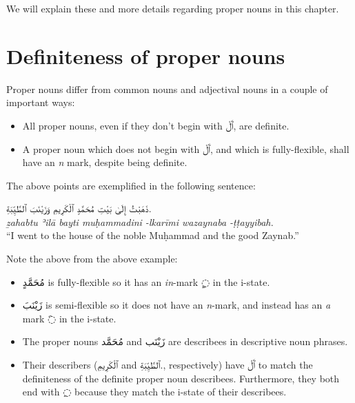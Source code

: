 \documentclass[
  10pt,
]{book}
\providecommand{\tightlist}{%
  \setlength{\itemsep}{0pt}\setlength{\parskip}{0pt}}
\begin{document}
We will explain these and more details regarding proper nouns in this chapter.

\section{Definiteness of proper nouns}\label{definiteness-of-proper-nouns}

Proper nouns differ from common nouns and adjectival nouns in a couple of important ways:

\begin{itemize}
\tightlist
\item
  All proper nouns, even if they don't begin with \foreignlanguage{arabic}{ٱَلْ}, are definite.
\item
  A proper noun which does not begin with \foreignlanguage{arabic}{ٱَلْ}, and which is fully-flexible, shall have an \emph{n} mark, despite being definite.
\end{itemize}

The above points are exemplified in the following sentence:

\foreignlanguage{arabic}{ذَهَبْتُ إِلَىٰ بَيْتِ مُحَمَّدٍ ٱلْکَرِيمِ وَزَيْنَبَ ٱلطَّيِّبَةِ.}\\
\emph{ẕahabtu ʾilā bayti muḥammadini -lkarīmi wazaynaba -ṭṭayyibah.}\\
\enquote{I went to the house of the noble Muḥammad and the good Zaynab.}

Note the above from the above example:

\begin{itemize}
\tightlist
\item
  \foreignlanguage{arabic}{مُحَمَّدٍ} is fully-flexible so it has an \emph{in}-mark \foreignlanguage{arabic}{◌ٍ} in the i-state.
\item
  \foreignlanguage{arabic}{زَيْنَبَ} is semi-flexible so it does not have an \emph{n}-mark, and instead has an \emph{a} mark \foreignlanguage{arabic}{◌َ} in the i-state.
\item
  The proper nouns \foreignlanguage{arabic}{مُحَمَّد} and \foreignlanguage{arabic}{زَيْنَب} are describees in descriptive noun phrases.
\item
  Their describers (\foreignlanguage{arabic}{ٱلْکَرِيمِ} and \foreignlanguage{arabic}{ٱلطَّيِّبَةِ.}, respectively) have \foreignlanguage{arabic}{ٱَلْ} to match the definiteness of the definite proper noun describees. Furthermore, they both end with \foreignlanguage{arabic}{◌ِ} because they match the i-state of their describees.
\end{itemize}
\end{document}
